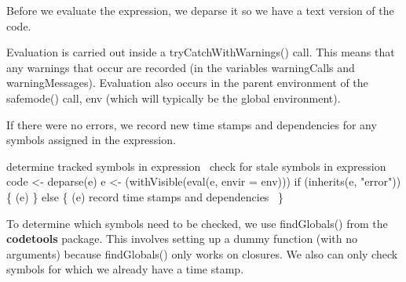 \documentclass[a4paper]{article}%
\newcommand{\pkg}[1]{{\bf #1}}
\begin{document}
Before we evaluate the expression, we deparse it so we have a text
version of the code.

Evaluation is carried out inside a {\Tt{}tryCatchWithWarnings()\nwendquote} call.
This means that any warnings that occur are recorded (in the variables
{\Tt{}warningCalls\nwendquote} and {\Tt{}warningMessages\nwendquote}).  Evaluation also occurs
in the parent environment of the {\Tt{}safemode()\nwendquote} call, {\Tt{}env\nwendquote} (which will
typically be the global environment).  

If there were no errors, we record new time stamps and dependencies
for any symbols assigned in the expression.

\nwenddocs{}\endmoddef\nwstartdeflinemarkup{}\nwenddeflinemarkup
\LA{}determine tracked symbols in expression~{\nwtagstyle{}}\RA{}
\LA{}check for stale symbols in expression~{\nwtagstyle{}}\RA{}
code <- deparse(e)                                 
e <- (withVisible(eval(e,
                                           envir = env)))
if (inherits(e, "error")) \{
    (e)
\} else \{
    (e)
    \LA{}record time stamps and dependencies~{\nwtagstyle{}}\RA{}
\}
\nwendcode{}\nwdocspar

To determine which symbols need to be checked, we use 
{\Tt{}findGlobals()\nwendquote} from the \pkg{codetools} package.
This involves setting up a dummy function (with no arguments)
because {\Tt{}findGlobals()\nwendquote}
only works on closures.  We also can only check symbols for which
we already have a time stamp.
\end{document}

